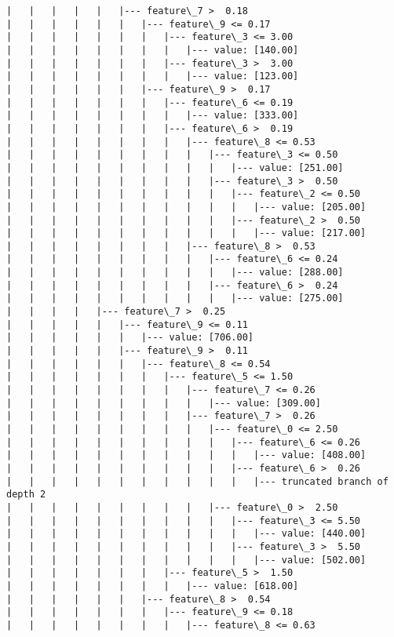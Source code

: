 \documentclass[11pt]{article}
\begin{document}
\begin{Verbatim}[commandchars=\\\{\}]
|   |   |   |   |   |--- feature\_7 >  0.18
|   |   |   |   |   |   |--- feature\_9 <= 0.17
|   |   |   |   |   |   |   |--- feature\_3 <= 3.00
|   |   |   |   |   |   |   |   |--- value: [140.00]
|   |   |   |   |   |   |   |--- feature\_3 >  3.00
|   |   |   |   |   |   |   |   |--- value: [123.00]
|   |   |   |   |   |   |--- feature\_9 >  0.17
|   |   |   |   |   |   |   |--- feature\_6 <= 0.19
|   |   |   |   |   |   |   |   |--- value: [333.00]
|   |   |   |   |   |   |   |--- feature\_6 >  0.19
|   |   |   |   |   |   |   |   |--- feature\_8 <= 0.53
|   |   |   |   |   |   |   |   |   |--- feature\_3 <= 0.50
|   |   |   |   |   |   |   |   |   |   |--- value: [251.00]
|   |   |   |   |   |   |   |   |   |--- feature\_3 >  0.50
|   |   |   |   |   |   |   |   |   |   |--- feature\_2 <= 0.50
|   |   |   |   |   |   |   |   |   |   |   |--- value: [205.00]
|   |   |   |   |   |   |   |   |   |   |--- feature\_2 >  0.50
|   |   |   |   |   |   |   |   |   |   |   |--- value: [217.00]
|   |   |   |   |   |   |   |   |--- feature\_8 >  0.53
|   |   |   |   |   |   |   |   |   |--- feature\_6 <= 0.24
|   |   |   |   |   |   |   |   |   |   |--- value: [288.00]
|   |   |   |   |   |   |   |   |   |--- feature\_6 >  0.24
|   |   |   |   |   |   |   |   |   |   |--- value: [275.00]
|   |   |   |   |--- feature\_7 >  0.25
|   |   |   |   |   |--- feature\_9 <= 0.11
|   |   |   |   |   |   |--- value: [706.00]
|   |   |   |   |   |--- feature\_9 >  0.11
|   |   |   |   |   |   |--- feature\_8 <= 0.54
|   |   |   |   |   |   |   |--- feature\_5 <= 1.50
|   |   |   |   |   |   |   |   |--- feature\_7 <= 0.26
|   |   |   |   |   |   |   |   |   |--- value: [309.00]
|   |   |   |   |   |   |   |   |--- feature\_7 >  0.26
|   |   |   |   |   |   |   |   |   |--- feature\_0 <= 2.50
|   |   |   |   |   |   |   |   |   |   |--- feature\_6 <= 0.26
|   |   |   |   |   |   |   |   |   |   |   |--- value: [408.00]
|   |   |   |   |   |   |   |   |   |   |--- feature\_6 >  0.26
|   |   |   |   |   |   |   |   |   |   |   |--- truncated branch of depth 2
|   |   |   |   |   |   |   |   |   |--- feature\_0 >  2.50
|   |   |   |   |   |   |   |   |   |   |--- feature\_3 <= 5.50
|   |   |   |   |   |   |   |   |   |   |   |--- value: [440.00]
|   |   |   |   |   |   |   |   |   |   |--- feature\_3 >  5.50
|   |   |   |   |   |   |   |   |   |   |   |--- value: [502.00]
|   |   |   |   |   |   |   |--- feature\_5 >  1.50
|   |   |   |   |   |   |   |   |--- value: [618.00]
|   |   |   |   |   |   |--- feature\_8 >  0.54
|   |   |   |   |   |   |   |--- feature\_9 <= 0.18
|   |   |   |   |   |   |   |   |--- feature\_8 <= 0.63

\end{Verbatim}
\end{document}
